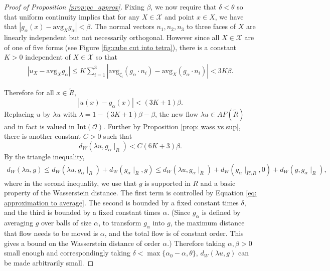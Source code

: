 \documentclass[11pt]{article}
\theoremstyle{remark}
\theoremstyle{definition}
\newcommand{\mc}[1]{\mathcal{#1}}
\begin{document}
\begin{proof}[Proof of Proposition \ref{prop:pc_approx}]
    Fixing $\beta$, we now require that $\delta<\theta$ so that uniform continuity implies that for any $X\in \mc X$ and point $x\in X$, we have that $|g_\alpha(x) - \text{avg}_X g_\alpha|<\beta$. The normal vectors $n_1,n_2,n_3$ to three faces of $X$ are linearly independent but not necessarily orthogonal. However since all $X\in \mc X$ are of one of five forms (see Figure \ref{fig:cube cut into tetra}), there is a constant $K>0$ independent of $X\in \mc X$ so that
    \begin{align*}
        |u_X - \text{avg}_X g_\alpha| \leq K\sum_{i=1}^3 |\text{avg}_{\zeta_i} (g_\alpha\cdot n_i) - \text{avg}_{X} (g_\alpha\cdot n_i)| < 3 K\beta. 
    \end{align*}

     Therefore for all $x\in \widetilde{R}$,
    \begin{equation}
        |u(x) - g_\alpha(x) | < (3K + 1)\beta.
    \end{equation}
    Replacing $u$ by $\lambda u$ with $\lambda = 1-(3K+1)\beta-\beta$, the new flow $\lambda u\in AF(\widetilde R)$ and in fact is valued in $\text{Int}(\mc O)$. Further by Proposition \ref{prop: wass vs sup}, there is another constant $C>0$ such that 
    \begin{equation}\label{eq: approximation to average}
        d_W(\lambda u,g_\alpha\mid_{\widetilde{R}})< C(6K+3) \beta.
    \end{equation}
     By the triangle inequality,
    \begin{align*}
        d_W(\lambda u, g) \leq d_W(\lambda u, g_\alpha\mid_{\widetilde{R}})+d_W(g_\alpha\mid_{\widetilde R},g)\leq 
        d_W(\lambda u,g_\alpha\mid_{\widetilde{R}}) + d_W(g_\alpha\mid_{\widetilde{R}\setminus R}, 0) + d_W(g,g_\alpha\mid_{R}),
    \end{align*}
    where in the second inequality, we use that $g$ is supported in $R$ and a basic property of the Wasserstein distance. The first term is controlled by Equation \eqref{eq: approximation to average}. The second is bounded by a fixed constant times $\delta$,  and the third is bounded by a fixed constant times $\alpha$. (Since $g_\alpha$ is defined by averaging $g$ over balls of size $\alpha$, to transform $g_\alpha$ into $g$, the maximum distance that flow needs to be moved is $\alpha$, and the total flow is of constant order. This gives a bound on the Wasserstein distance of order $\alpha$.) Therefore taking $\alpha,\beta>0$ small enough and correspondingly taking $\delta< \max\{\alpha_0-\alpha,\theta\}$, $d_W(\lambda u,g)$ can be made arbitrarily small. 


\end{proof}
\end{document}
